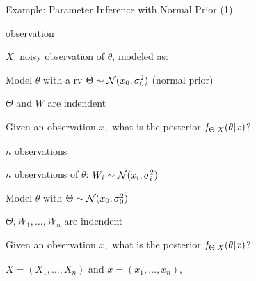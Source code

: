




\begin{frame}{Example: Parameter Inference with Normal Prior (1)}


  {
    \plitemsep 0.07in
    \bci
    
  \item<6->  observation

  \item<2-> $X$: noisy observation of $\theta$, modeled as:


  \item<3-> Model $\theta$ with a rv $\Theta \sim \mathcal N(x_0,\sigma_0^2)$
    (normal prior)
  \item<4-> $\Theta$ and $W$ are indendent
    
  \item<5-> \question Given an observation $x,$ what is the posterior $f_{\Theta|X}(\theta|x)$?
      
    \eci
  }
  {
    \plitemsep 0.03in
    \bci
    
  \item<6->  $n$ observations

  \item<7-> $n$ observations of $\theta$: $W_i \sim \mathcal N(x_i,\sigma_i^2)$
\vspace{-0.6cm}
\item<8-> Model $\theta$ with $\Theta \sim \mathcal N(x_0,\sigma_0^2)$
  \item<8-> $\Theta, W_1, \ldots, W_n$ are indendent
    
  \item<9-> \question Given an observation $x,$ what is
    the posterior $f_{\Theta|X}(\theta|x)$? 
\bci
    \item $X = (X_1, \ldots, X_n)$ and $x=(x_1, \ldots, x_n),$      
\eci
    \eci

  }


\end{frame}

